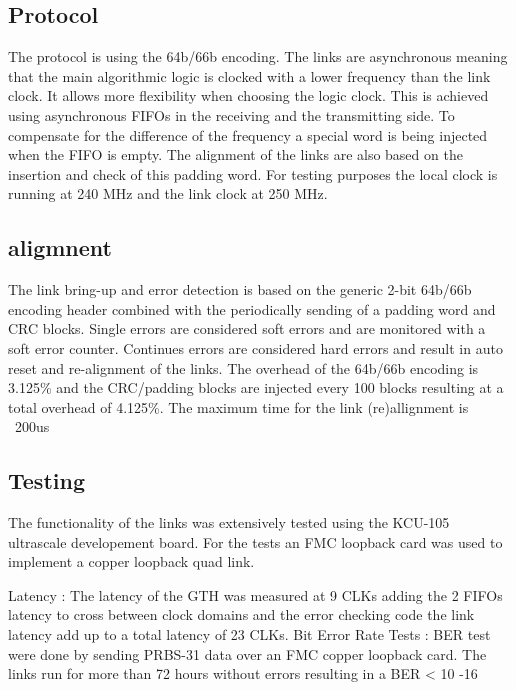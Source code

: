 \documentclass[a4paper]{PoS}
\begin{document}
\subsection{Protocol}
The protocol is using the 64b/66b encoding. The links are asynchronous meaning that the main algorithmic logic is clocked with a lower frequency than the link clock. It allows more flexibility when choosing the logic clock. This is achieved using asynchronous FIFOs in the receiving and the transmitting side. To compensate for the difference of the frequency a special word is being injected when the FIFO is empty. The alignment of the links are also based on the insertion and check of this padding word. For testing purposes the local clock is running at 240 MHz and the link clock at 250 MHz.


\subsection{aligmnent}
The link bring-up and error detection is based on the generic 2-bit 64b/66b encoding header combined with the periodically sending of a padding word and CRC blocks.
Single errors are considered soft errors and are monitored with a soft error counter.
Continues errors are considered hard errors and result in auto reset and re-alignment of the links. 
The overhead of the 64b/66b encoding is 3.125\% and the CRC/padding blocks are injected every 100 blocks resulting at a total overhead of 4.125\%.
The maximum time for the link (re)allignment is ~200us


\subsection*{Testing}
The functionality of the links was extensively tested using the KCU-105 ultrascale developement board. For the tests an FMC loopback card was used to implement a copper loopback quad link.

Latency :
The latency of the GTH was measured at 9 CLKs adding the 2 FIFOs latency to cross between clock domains and the error checking code the link latency add up to a total latency of 23 CLKs. 
Bit Error Rate Tests :
BER test were done by sending PRBS-31 data over an FMC copper loopback card. The links run for more than 72 hours without errors resulting in a BER < 10 -16
\end{document}
